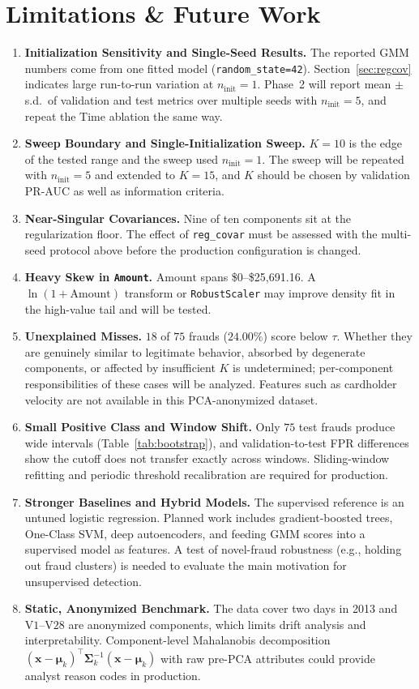 \documentclass[11pt, a4paper]{article}
\begin{document}
\section{Limitations \& Future Work}

\begin{enumerate}
    \item \textbf{Initialization Sensitivity and Single-Seed Results.} The reported GMM numbers come from one fitted model (\texttt{random\_state=42}). Section~\ref{sec:regcov} indicates large run-to-run variation at $n_{\text{init}}=1$. Phase~2 will report mean $\pm$ s.d.\ of validation and test metrics over multiple seeds with $n_{\text{init}}=5$, and repeat the Time ablation the same way.
    \item \textbf{Sweep Boundary and Single-Initialization Sweep.} $K=10$ is the edge of the tested range and the sweep used $n_{\text{init}}=1$. The sweep will be repeated with $n_{\text{init}}=5$ and extended to $K=15$, and $K$ should be chosen by validation PR-AUC as well as information criteria.
    \item \textbf{Near-Singular Covariances.} Nine of ten components sit at the regularization floor. The effect of \texttt{reg\_covar} must be assessed with the multi-seed protocol above before the production configuration is changed.
    \item \textbf{Heavy Skew in \texttt{Amount}.} $\text{Amount}$ spans \$0--\$25,691.16. A $\ln(1+\text{Amount})$ transform or \texttt{RobustScaler} may improve density fit in the high-value tail and will be tested.
    \item \textbf{Unexplained Misses.} $18$ of $75$ frauds ($24.00\%$) score below $\tau$. Whether they are genuinely similar to legitimate behavior, absorbed by degenerate components, or affected by insufficient $K$ is undetermined; per-component responsibilities of these cases will be analyzed. Features such as cardholder velocity are not available in this PCA-anonymized dataset.
    \item \textbf{Small Positive Class and Window Shift.} Only $75$ test frauds produce wide intervals (Table~\ref{tab:bootstrap}), and validation-to-test FPR differences show the cutoff does not transfer exactly across windows. Sliding-window refitting and periodic threshold recalibration are required for production.
    \item \textbf{Stronger Baselines and Hybrid Models.} The supervised reference is an untuned logistic regression. Planned work includes gradient-boosted trees, One-Class SVM, deep autoencoders, and feeding GMM scores into a supervised model as features. A test of novel-fraud robustness (e.g., holding out fraud clusters) is needed to evaluate the main motivation for unsupervised detection.
    \item \textbf{Static, Anonymized Benchmark.} The data cover two days in 2013 and $\text{V1}$--$\text{V28}$ are anonymized components, which limits drift analysis and interpretability. Component-level Mahalanobis decomposition $(\mathbf{x} - \boldsymbol{\mu}_k)^{\top}\boldsymbol{\Sigma}_k^{-1}(\mathbf{x} - \boldsymbol{\mu}_k)$ with raw pre-PCA attributes could provide analyst reason codes in production.
\end{enumerate}
\end{document}
